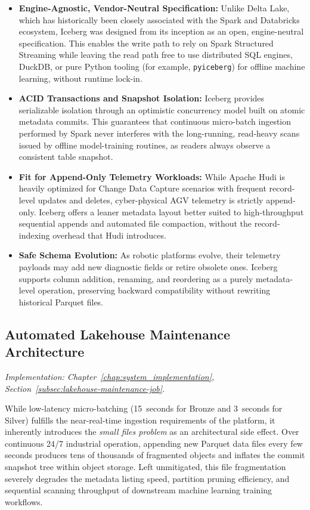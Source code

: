 \begin{itemize}
    \item \textbf{Engine-Agnostic, Vendor-Neutral Specification:} Unlike Delta Lake, which has historically been closely associated with the Spark and Databricks ecosystem, Iceberg was designed from its inception as an open, engine-neutral specification.
    This enables the write path to rely on Spark Structured Streaming while leaving the read path free to use distributed SQL engines, DuckDB, or pure Python tooling (for example, \texttt{pyiceberg}) for offline machine learning, without runtime lock-in.

    \item \textbf{ACID Transactions and Snapshot Isolation:} Iceberg provides serializable isolation through an optimistic concurrency model built on atomic metadata commits.
    This guarantees that continuous micro-batch ingestion performed by Spark never interferes with the long-running, read-heavy scans issued by offline model-training routines, as readers always observe a consistent table snapshot.

    \item \textbf{Fit for Append-Only Telemetry Workloads:} While Apache Hudi is heavily optimized for Change Data Capture scenarios with frequent record-level updates and deletes, cyber-physical AGV telemetry is strictly append-only.
    Iceberg offers a leaner metadata layout better suited to high-throughput sequential appends and automated file compaction, without the record-indexing overhead that Hudi introduces.

    \item \textbf{Safe Schema Evolution:} As robotic platforms evolve, their telemetry payloads may add new diagnostic fields or retire obsolete ones.
    Iceberg supports column addition, renaming, and reordering as a purely metadata-level operation, preserving backward compatibility without rewriting historical Parquet files.
\end{itemize}

\subsection{Automated Lakehouse Maintenance Architecture}
\label{subsec:arch-lakehouse-maintenance}
\textit{Implementation: Chapter~\ref{chap:system_implementation}, Section~\ref{subsec:lakehouse-maintenance-job}.}

While low-latency micro-batching (15~seconds for Bronze and 3~seconds for Silver) fulfills the near-real-time ingestion requirements of the platform, it inherently introduces the \textit{small files problem} as an architectural side effect. Over continuous 24/7 industrial operation, appending new Parquet data files every few seconds produces tens of thousands of fragmented objects and inflates the commit snapshot tree within object storage. Left unmitigated, this file fragmentation severely degrades the metadata listing speed, partition pruning efficiency, and sequential scanning throughput of downstream machine learning training workflows.

